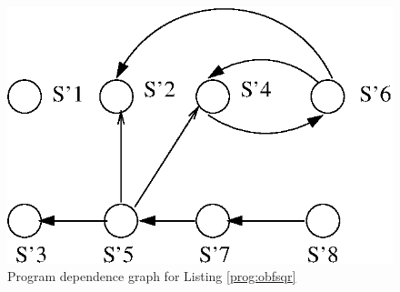 \documentclass[conference]{IEEEtran}
\begin{document}
\begin{figure}[h]
 \centering
 \includegraphics[scale=0.3]{./obfdep1.eps}
 \caption{Program dependence graph for Listing \ref{prog:obfsqr}}
 \label{fig:obfsqr1}
\end{figure}
\end{document}
